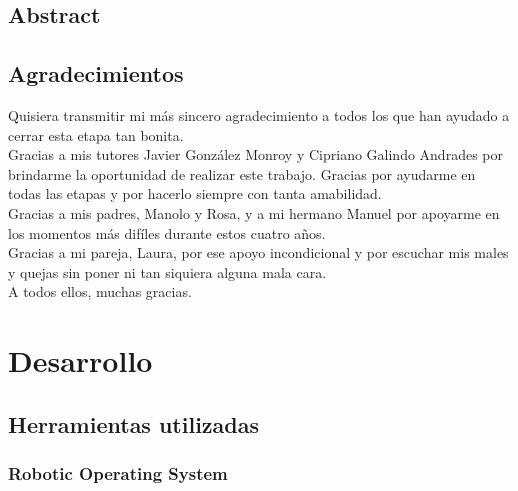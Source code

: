 \chapter*{Abstract}

\chapter*{Agradecimientos}

Quisiera transmitir mi más sincero agradecimiento a todos los que han ayudado a cerrar esta etapa tan bonita.\\

Gracias a mis tutores Javier González Monroy y Cipriano Galindo Andrades por brindarme la oportunidad de realizar este trabajo. Gracias por ayudarme en todas las etapas y por hacerlo siempre con tanta amabilidad.\\

Gracias a mis padres, Manolo y Rosa, y a mi hermano Manuel por apoyarme en los momentos más difíles durante estos cuatro años.\\

Gracias a mi pareja, Laura, por ese apoyo incondicional y por escuchar mis males y quejas sin poner ni tan siquiera alguna mala cara.\\

A todos ellos, muchas gracias.\\

\tableofcontents

\cleardoublepage
{} %
\listoffigures %

\cleardoublepage
{} %
\listoftables %



\part{Desarrollo}

\chapter{Herramientas utilizadas}

\section{Robotic Operating System}

